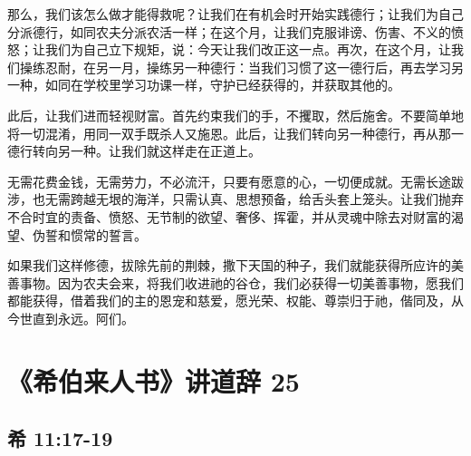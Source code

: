 那么，我们该怎么做才能得救呢？让我们在有机会时开始实践德行；让我们为自己分派德行，如同农夫分派农活一样；在这个月，让我们克服诽谤、伤害、不义的愤怒；让我们为自己立下规矩，说：今天让我们改正这一点。再次，在这个月，让我们操练忍耐，在另一月，操练另一种德行：当我们习惯了这一德行后，再去学习另一种，如同在学校里学习功课一样，守护已经获得的，并获取其他的。\par

此后，让我们进而轻视财富。首先约束我们的手，不攫取，然后施舍。不要简单地将一切混淆，用同一双手既杀人又施恩。此后，让我们转向另一种德行，再从那一德行转向另一种。让我们就这样走在正道上。\par

无需花费金钱，无需劳力，不必流汗，只要有愿意的心，一切便成就。无需长途跋涉，也无需跨越无垠的海洋，只需认真、思想预备，给舌头套上笼头。让我们抛弃不合时宜的责备、愤怒、无节制的欲望、奢侈、挥霍，并从灵魂中除去对财富的渴望、伪誓和惯常的誓言。\par

如果我们这样修德，拔除先前的荆棘，撒下天国的种子，我们就能获得所应许的美善事物。因为农夫会来，将我们收进祂的谷仓，我们必获得一切美善事物，愿我们都能获得，借着我们的主的恩宠和慈爱，愿光荣、权能、尊崇归于祂，偕同及，从今世直到永远。阿们。\par



\section{《希伯来人书》讲道辞 25}


\subsection{希 11:17-19}

\par

